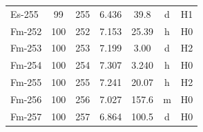 \documentclass[11pt,a4paper]{article}
\begin{document}
\begin{small}
\begin{longtable}{lcccccc}
Es-255 & 99 & 255 & 6.436 & 39.8 & d & H1 \\
Fm-252 & 100 & 252 & 7.153 & 25.39 & h & H0 \\
Fm-253 & 100 & 253 & 7.199 & 3.00 & d & H2 \\
Fm-254 & 100 & 254 & 7.307 & 3.240 & h & H0 \\
Fm-255 & 100 & 255 & 7.241 & 20.07 & h & H2 \\
Fm-256 & 100 & 256 & 7.027 & 157.6 & m & H0 \\
Fm-257 & 100 & 257 & 6.864 & 100.5 & d & H0 \\
\end{longtable}
\end{small}

%
%
%
\end{document}
